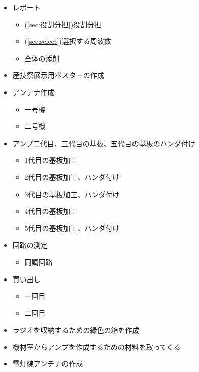 \documentclass[report.tex]{subfiles}
\begin{document}
\begin{itemize}
	\item レポート
	      \begin{itemize}
		      \item (\ref{sec:役割分担})役割分担
		      \item (\ref{sec:select})選択する周波数
		      \item 全体の添削
	      \end{itemize}
	\item 産技祭展示用ポスターの作成
	\item アンテナ作成
	      \begin{itemize}
		      \item 一号機
		      \item 二号機
	      \end{itemize}
	\item アンプ二代目、三代目の基板、五代目の基板のハンダ付け
	      \begin{itemize}
		      \item 1代目の基板加工
		      \item 2代目の基板加工、ハンダ付け
		      \item 3代目の基板加工、ハンダ付け
		      \item 4代目の基板加工
		      \item 5代目の基板加工、ハンダ付け
	      \end{itemize}
	\item 回路の測定
	      \begin{itemize}
		      \item 同調回路
	      \end{itemize}
	\item 買い出し
	      \begin{itemize}
		      \item 一回目
		      \item 二回目
	      \end{itemize}
	\item ラジオを収納するための緑色の箱を作成
	\item 機材室からアンプを作成するための材料を取ってくる
	\item 電灯線アンテナの作成
\end{itemize}
\end{document}
